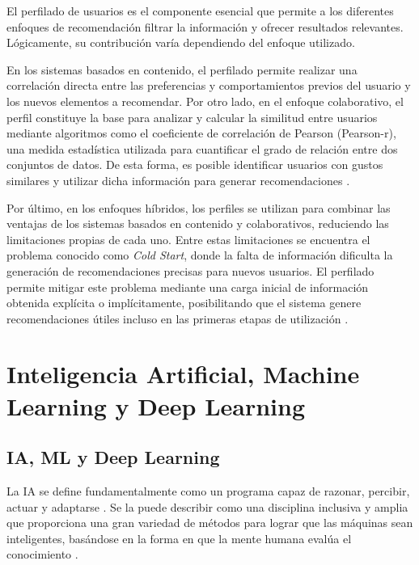 El perfilado de usuarios es el componente esencial que permite a los diferentes enfoques de recomendación filtrar la información y ofrecer resultados relevantes. Lógicamente, su contribución varía dependiendo del enfoque utilizado.

En los sistemas basados en contenido, el perfilado permite realizar una correlación directa entre las preferencias y comportamientos previos del usuario y los nuevos elementos a recomendar. Por otro lado, en el enfoque colaborativo, el perfil constituye la base para analizar y calcular la similitud entre usuarios mediante algoritmos como el coeficiente de correlación de Pearson (Pearson-r), una medida estadística utilizada para cuantificar el grado de relación entre dos conjuntos de datos. De esta forma, es posible identificar usuarios con gustos similares y utilizar dicha información para generar recomendaciones \parencite{MiddletonEtAl2004}.

Por último, en los enfoques híbridos, los perfiles se utilizan para combinar las ventajas de los sistemas basados en contenido y colaborativos, reduciendo las limitaciones propias de cada uno. Entre estas limitaciones se encuentra el problema conocido como \emph{Cold Start}, donde la falta de información dificulta la generación de recomendaciones precisas para nuevos usuarios. El perfilado permite mitigar este problema mediante una carga inicial de información obtenida explícita o implícitamente, posibilitando que el sistema genere recomendaciones útiles incluso en las primeras etapas de utilización \parencite{MiddletonEtAl2004}.

\section{Inteligencia Artificial, Machine Learning y Deep Learning}\label{sec:ia_ml_dl}

\subsection{IA, ML y Deep Learning}\label{subsec:ia_ml_dl_definicion}

La IA se define fundamentalmente como un programa capaz de razonar, percibir, actuar y adaptarse \parencite{GandhiGandhi2022}. Se la puede describir como una disciplina inclusiva y amplia que proporciona una gran variedad de métodos para lograr que las máquinas sean inteligentes, basándose en la forma en que la mente humana evalúa el conocimiento \parencite{GandhiGandhi2022}.

